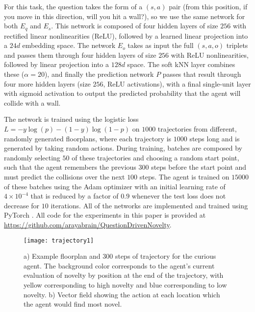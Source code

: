\documentclass[letterpaper]{article}
\begin{document}
For this task, the question takes the form of a $(s,a)$ pair (from this position, if you move in this direction, will you hit a wall?), so we use the same network for both $E_q$ and $E_s$. This network is composed of four hidden layers of size $256$ with rectified linear nonlinearities (ReLU), followed by a learned linear projection into a $24d$ embedding space. The network $E_o$ takes as input the full $(s,a,o)$ triplets and passes them through four hidden layers of size $256$ with ReLU nonlinearities, followed by linear projection into a $128d$ space. The soft kNN layer combines these ($\alpha = 20$), and finally the prediction network $P$ passes that result through four more hidden layers (size $256$, ReLU activations), with a final single-unit layer with sigmoid activation to output the predicted probability that the agent will collide with a wall.

The network is trained using the logistic loss $L = -y\log(p)-(1-y)\log(1-p)$ on $1000$ trajectories from different, randomly generated floorplans, where each trajectory is $1000$ steps long and is generated by taking random actions. During training, batches are composed by randomly selecting $50$ of these trajectories and choosing a random start point, such that the agent remembers the previous $300$ steps before the start point and must predict the collisions over the next $100$ steps. The agent is trained on $15000$ of these batches using the Adam optimizer \citep{kingma2014adam} with an initial learning rate of $4\times 10^{-4}$ that is reduced by a factor of $0.9$ whenever the test loss does not decrease for $10$ iterations. All of the networks are implemented and trained using PyTorch \citep{paszke2017automatic}. All code for the experiments in this paper is provided at \url{https://github.com/arayabrain/QuestionDrivenNovelty}.

\begin{figure}
\texttt{[image: trajectory1]}
\caption{ \label{Trajectory} a) Example floorplan and 300 steps of trajectory for the curious agent. The background color corresponds to the agent's current evaluation of novelty by position at the end of the trajectory, with yellow corresponding to high novelty and blue corresponding to low novelty. b) Vector field showing the action at each location which the agent would find most novel. }
\end{figure}
\end{document}

